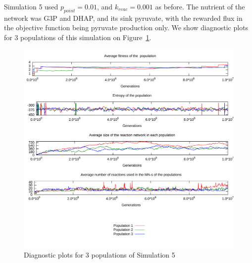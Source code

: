 \documentclass[a4paper,12pt]{article}
\begin{document}
Simulation 5 used $p_{point}=0.01$, and $k_{reac}=0.001$ as before. The nutrient of the network was G3P and DHAP, and its sink pyruvate, with the rewarded flux in the objective function being pyruvate production only. We show diagnostic plots for $3$ populations of this simulation on Figure~\ref{fig:simulationpyruvonly}.

\begin{figure}[htpb]
	\centering
	\includegraphics[width=0.8\linewidth]{simulationpyruvonly.pdf}
	\caption{Diagnostic plots for 3 populations of Simulation 5}
	\label{fig:simulationpyruvonly}
\end{figure}
\end{document}
